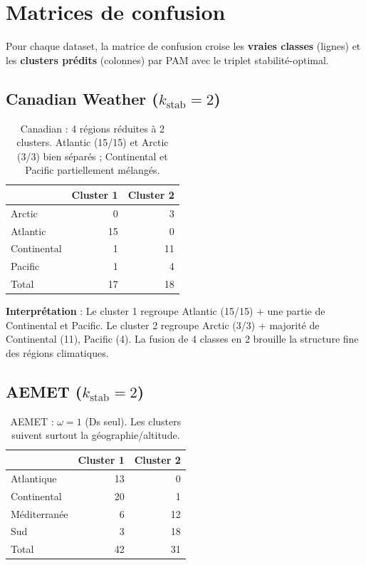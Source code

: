 \documentclass[11pt, a4paper]{article}
\begin{document}
\section{Matrices de confusion}

Pour chaque dataset, la matrice de confusion croise les \textbf{vraies
classes} (lignes) et les \textbf{clusters prédits} (colonnes) par PAM avec
le triplet stabilité-optimal.

\subsection{Canadian Weather ($k_{\mathrm{stab}} = 2$)}

\begin{table}[H]
\centering
\begin{tabular}{lrr}
\toprule
& Cluster 1 & Cluster 2 \\
\midrule
Arctic     & 0 & 3 \\
Atlantic   & 15 & 0 \\
Continental & 1 & 11 \\
Pacific    & 1 & 4 \\
\midrule
Total      & 17 & 18 \\
\bottomrule
\end{tabular}
\caption{Canadian : 4 régions réduites à 2 clusters. Atlantic (15/15) et
Arctic (3/3) bien séparés ; Continental et Pacific partiellement mélangés.}
\end{table}

\textbf{Interprétation} : Le cluster 1 regroupe Atlantic (15/15) + une partie
de Continental et Pacific. Le cluster 2 regroupe Arctic (3/3) + majorité
de Continental (11), Pacific (4). La fusion de 4 classes en 2 brouille la
structure fine des régions climatiques.

\subsection{AEMET ($k_{\mathrm{stab}} = 2$)}

\begin{table}[H]
\centering
\begin{tabular}{lrr}
\toprule
& Cluster 1 & Cluster 2 \\
\midrule
Atlantique   & 13 & 0 \\
Continental  & 20 & 1 \\
Méditerranée & 6 & 12 \\
Sud         & 3 & 18 \\
\midrule
Total       & 42 & 31 \\
\bottomrule
\end{tabular}
\caption{AEMET : $\omega = 1$ (Ds seul). Les clusters suivent surtout la
géographie/altitude.}
\end{table}
\end{document}
